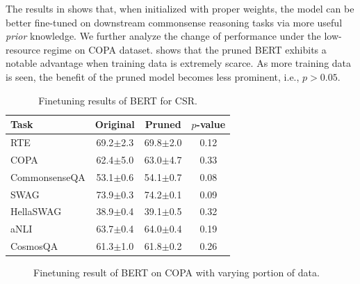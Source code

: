 The results in  shows that, when initialized with proper weights, the model can be better fine-tuned on downstream commonsense reasoning tasks via more useful \textit{prior} knowledge. We further analyze the change of performance under the low-resource regime on COPA dataset.  shows that the pruned \textsc{BERT} exhibits a notable advantage when training data is extremely scarce. As more training data is seen, the benefit of the pruned 
model becomes less prominent, i.e., $p>0.05$.
\begin{table}[t!]
	\centering
	\scriptsize
	\begin{tabular}{l|cc|c}
		\toprule
		\textbf{Task} & \textbf{Original} & \textbf{Pruned} &$p$-value \\
		\midrule
		RTE & 69.2$\pm${\scriptsize 2.3} & 69.8$\pm${\scriptsize2.0}& 0.12\\

		COPA & 62.4$\pm${\scriptsize 5.0} & 63.0$\pm${\scriptsize 4.7} &0.33  \\

		CommonsenseQA & 53.1$\pm${\scriptsize 0.6} & 54.1$\pm${\scriptsize 0.7} &0.08\\

		SWAG & 73.9$\pm${\scriptsize 0.3} & 74.2$\pm${\scriptsize 0.1} &0.09\\
		HellaSWAG & 38.9$\pm${\scriptsize 0.4} & 39.1$\pm${\scriptsize 0.5}&0.32  \\
		aNLI &63.7$\pm${\scriptsize 0.4} &64.0$\pm${\scriptsize 0.4}  &0.19\\
		CosmosQA &61.3$\pm${\scriptsize 1.0} &61.8$\pm${\scriptsize 0.2} &0.26\\
		\bottomrule
	\end{tabular}
	\caption{Finetuning results of \textsc{BERT} for CSR.}
	\label{table:finetuning}
\end{table}
\begin{figure}[t]
	\centering
	\caption{Finetuning result of \textsc{BERT} on COPA with varying portion of data.} \label{fig:copa}
\end{figure}
